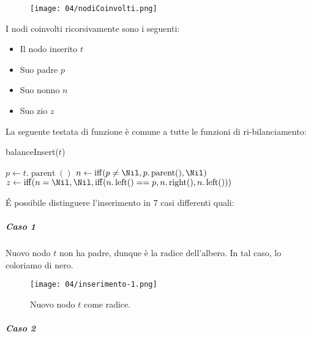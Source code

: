             \begin{wrapfigure}{l}{0.3\textwidth}
                \centering
                \texttt{[image: 04/nodiCoinvolti.png]}
            \end{wrapfigure}

            I nodi coinvolti ricorsivamente sono i seguenti:

            \begin{itemize}
                \item Il nodo inserito $ t $
                \item Suo padre $ p $
                \item Suo nonno $ n $
                \item Suo zio $ z $
            \end{itemize}
            
            La seguente testata di funzione è comune a tutte le funzioni di ri-bilanciamento:
            \begin{algorithm}[H]
                \caption{balanceInsert(\Tree $ t $)}
                \begin{algorithmic}
                    \State \Tree $ p \gets t.\operatorname{parent}()$
                    \State \Tree $ n \gets \operatorname{iff}(p \neq \Nil, p.\operatorname{parent}(), \Nil)$
                    \State \Tree $ z \gets \operatorname{iff}(n = \Nil, \Nil, \operatorname{iff}(n.\operatorname{left}() == p, n.\operatorname{right}(), n.\operatorname{left}()))$
                \end{algorithmic}
            \end{algorithm}

            É possibile distinguere l'inserimento in 7 casi differenti quali:
            
                \subparagraph{Caso 1}
                
                Nuovo nodo $ t $ non ha padre, dunque è la radice dell'albero. In tal caso, lo coloriamo di nero.
                
                \begin{figure}[H]
                    \centering
                    \texttt{[image: 04/inserimento-1.png]}
                    \caption{Nuovo nodo $t$ come radice.}
                \end{figure}
                
                \subparagraph{Caso 2}
                
